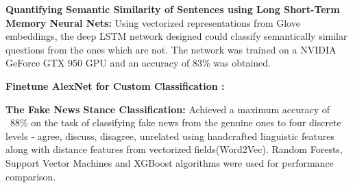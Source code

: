 %
\begin{cventries}
\vspace{-5mm}
  \cventry
    {}
    {}
    {}
    {}
    {
      \begin{cvitems}
      \item {{ \textbf{Quantifying Semantic Similarity of Sentences using Long Short-Term Memory Neural Nets:} Using vectorized representations from Glove embeddings, the deep LSTM network designed could classify semantically similar questions from the ones which are not. The network was trained on a NVIDIA GeForce GTX 950 GPU and an accuracy of 83\% was obtained.}}
      \item {{\textbf{Finetune AlexNet for Custom Classification : } }}
      \item { \textbf{The Fake News Stance Classification:} Achieved a maximum accuracy of ~88\% on the task of classifying fake news from the genuine ones to four discrete levels - agree, discuss, disagree, unrelated using handcrafted linguistic features along with distance features from vectorized fields(Word2Vec). Random Forests, Support Vector Machines and XGBoost algorithms were used for performance comparison.}
      \end{cvitems}
    }
\end{cventries}
